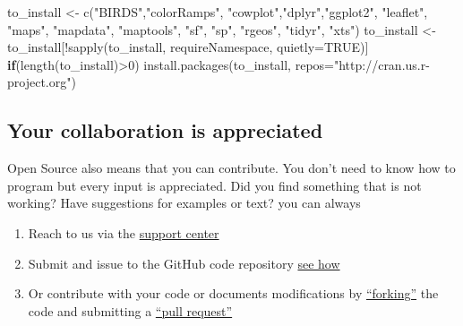 \documentclass[
  10pt,
]{article}
\newenvironment{Shaded}{\begin{snugshade}}{\end{snugshade}}
\newcommand{\AttributeTok}[1]{\textcolor[rgb]{0.77,0.63,0.00}{#1}}
\newcommand{\ConstantTok}[1]{\textcolor[rgb]{0.00,0.00,0.00}{#1}}
\newcommand{\ControlFlowTok}[1]{\textcolor[rgb]{0.13,0.29,0.53}{\textbf{#1}}}
\newcommand{\DecValTok}[1]{\textcolor[rgb]{0.00,0.00,0.81}{#1}}
\newcommand{\FunctionTok}[1]{\textcolor[rgb]{0.00,0.00,0.00}{#1}}
\newcommand{\NormalTok}[1]{#1}
\newcommand{\OtherTok}[1]{\textcolor[rgb]{0.56,0.35,0.01}{#1}}
\newcommand{\SpecialCharTok}[1]{\textcolor[rgb]{0.00,0.00,0.00}{#1}}
\newcommand{\StringTok}[1]{\textcolor[rgb]{0.31,0.60,0.02}{#1}}
\providecommand{\tightlist}{%
  \setlength{\itemsep}{0pt}\setlength{\parskip}{0pt}}
\begin{document}
\begin{Shaded}
\begin{Highlighting}[]
\NormalTok{to\_install }\OtherTok{\textless{}{-}} \FunctionTok{c}\NormalTok{(}\StringTok{"BIRDS"}\NormalTok{,}\StringTok{"colorRamps"}\NormalTok{, }\StringTok{"cowplot"}\NormalTok{,}\StringTok{"dplyr"}\NormalTok{,}\StringTok{"ggplot2"}\NormalTok{, }\StringTok{"leaflet"}\NormalTok{,}
                \StringTok{"maps"}\NormalTok{, }\StringTok{"mapdata"}\NormalTok{, }\StringTok{"maptools"}\NormalTok{, }\StringTok{"sf"}\NormalTok{, }\StringTok{"sp"}\NormalTok{, }\StringTok{"rgeos"}\NormalTok{, }\StringTok{"tidyr"}\NormalTok{, }\StringTok{"xts"}\NormalTok{)}
\NormalTok{to\_install }\OtherTok{\textless{}{-}}\NormalTok{ to\_install[}\SpecialCharTok{!}\FunctionTok{sapply}\NormalTok{(to\_install, requireNamespace, }\AttributeTok{quietly=}\ConstantTok{TRUE}\NormalTok{)]}
\ControlFlowTok{if}\NormalTok{(}\FunctionTok{length}\NormalTok{(to\_install)}\SpecialCharTok{\textgreater{}}\DecValTok{0}\NormalTok{)}
    \FunctionTok{install.packages}\NormalTok{(to\_install, }\AttributeTok{repos=}\StringTok{"http://cran.us.r{-}project.org"}\NormalTok{)}
\end{Highlighting}
\end{Shaded}

\hypertarget{your-collaboration-is-appreciated}{%
\subsection*{Your collaboration is appreciated}\label{your-collaboration-is-appreciated}}

Open Source also means that you can contribute. You don't need to know how to program
but every input is appreciated. Did you find something that is not working?
Have suggestions for examples or text? you can always

\begin{enumerate}
\def\labelenumi{\arabic{enumi}.}
\tightlist
\item
  Reach to us via the \href{https://docs.biodiversitydata.se/support/}{support center}
\item
  Submit and issue to the GitHub code repository \href{https://docs.github.com/en/github/managing-your-work-on-github/managing-your-work-with-issues-and-pull-requests/creating-an-issue}{see how}
\item
  Or contribute with your code or documents modifications by \href{https://docs.github.com/en/github/getting-started-with-github/quickstart/fork-a-repo}{``forking''}
  the code and submitting a \href{https://docs.github.com/en/github/collaborating-with-issues-and-pull-requests/proposing-changes-to-your-work-with-pull-requests/creating-a-pull-request-from-a-fork}{``pull request''}
\end{enumerate}
\end{document}

